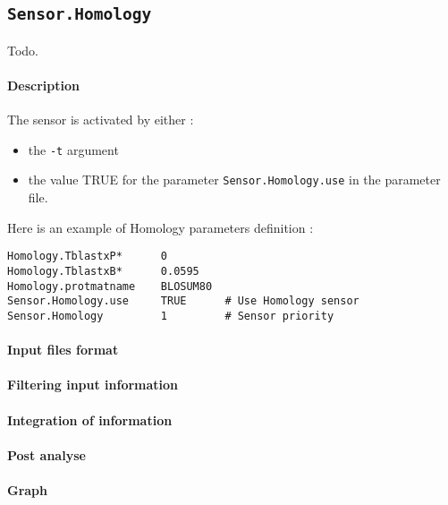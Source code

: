
\subsection{\texttt{Sensor.Homology}}

Todo.

\paragraph{Description}

The sensor is activated by either :
\begin{itemize}
\item the \texttt{-t} argument 
\item the value TRUE for the parameter \texttt{Sensor.Homology.use} in the
  parameter file.
\end{itemize}
Here is an example of Homology parameters definition :
\begin{Verbatim}[fontsize=\small]
Homology.TblastxP*      0
Homology.TblastxB*      0.0595
Homology.protmatname    BLOSUM80
Sensor.Homology.use     TRUE      # Use Homology sensor
Sensor.Homology         1         # Sensor priority
\end{Verbatim}

\paragraph{Input files format}

\paragraph{Filtering input information}

\paragraph{Integration of information}

\paragraph{Post analyse}

\paragraph{Graph}

